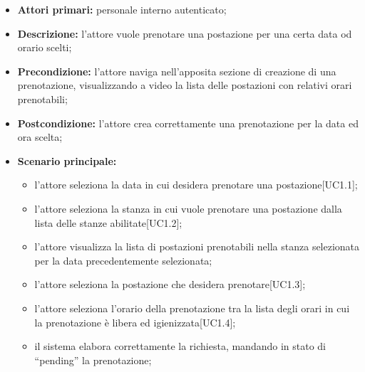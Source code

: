 \begin{itemize}
\item \textbf{Attori primari:} personale interno autenticato;
\item \textbf{Descrizione:} l'attore vuole prenotare una postazione per una certa data od orario scelti;
\item \textbf{Precondizione:} l'attore naviga nell’apposita sezione di creazione di una prenotazione, visualizzando a video la lista delle postazioni con relativi orari prenotabili;
\item \textbf{Postcondizione:} l'attore crea correttamente una prenotazione per la data ed ora scelta;
\item \textbf{Scenario principale:} 
	\begin{itemize}
		\item l'attore seleziona la data in cui desidera prenotare una postazione[UC1.1];
		\item l'attore seleziona la stanza in cui vuole prenotare una postazione dalla lista delle stanze abilitate[UC1.2];
		\item l'attore visualizza la lista di postazioni prenotabili nella stanza selezionata per la data precedentemente selezionata;
		\item l'attore seleziona la postazione che desidera prenotare[UC1.3];
		\item l'attore seleziona l'orario della prenotazione tra la lista degli orari in cui la prenotazione è libera ed igienizzata[UC1.4];
		\item il sistema elabora correttamente la richiesta, mandando in stato di “pending” la prenotazione;
	\end{itemize}
\end{itemize}



